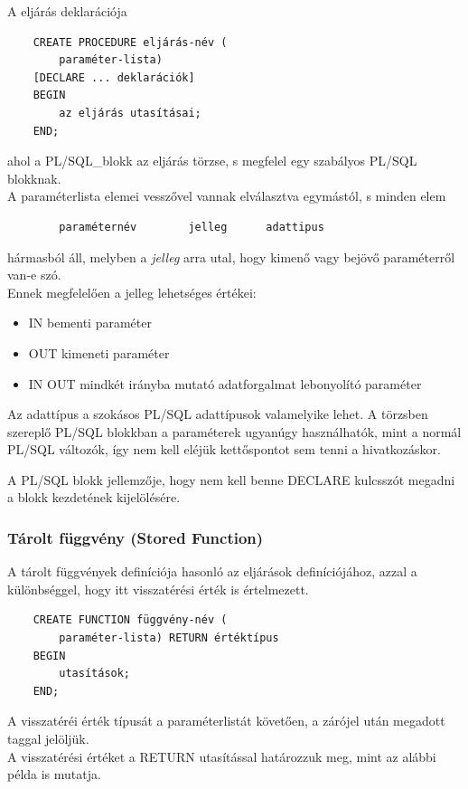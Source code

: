 \documentclass[tikz,12pt,margin=0px]{article}
\begin{document}
    \noindent A eljárás deklarációja
    {\small
    \begin{verbatim}
    CREATE PROCEDURE eljárás-név (
        paraméter-lista)
    [DECLARE ... deklarációk]
    BEGIN
        az eljárás utasításai;
    END;
    \end{verbatim}
    }
    \noindent ahol a PL/SQL\_blokk az eljárás törzse, s megfelel egy szabályos PL/SQL blokknak.\\
    A paraméterlista elemei vesszővel vannak elválasztva egymástól, s minden elem
    \begin{verbatim}
		paraméternév		jelleg		adattipus
    \end{verbatim}
    hármasból áll, melyben a \emph{jelleg} arra utal, hogy kimenő vagy bejövő paraméterről van-e szó.\\
    Ennek megfelelően a jelleg lehetséges értékei:
    \begin{itemize}
	   \item IN		bementi paraméter
	   \item OUT		kimeneti paraméter
	   \item IN OUT	mindkét irányba mutató adatforgalmat lebonyolító paraméter
    \end{itemize}
    \noindent Az adattípus a szokásos PL/SQL adattípusok valamelyike lehet. A törzsben szereplő PL/SQL blokkban a paraméterek ugyanúgy használhatók, mint a normál PL/SQL változók, így nem kell eléjük kettőspontot sem tenni a hivatkozáskor.

    \noindent A PL/SQL blokk jellemzője, hogy nem kell benne DECLARE kulcsszót megadni a blokk kezdetének kijelölésére.
\newpage
    \subsubsection*{Tárolt függvény (Stored Function)}

    \noindent A tárolt függvények definíciója hasonló az eljárások definíciójához, azzal a különbséggel, hogy itt visszatérési érték is értelmezett.
    {\small
    \begin{verbatim}
    CREATE FUNCTION függvény-név (
        paraméter-lista) RETURN értéktípus
    BEGIN
        utasítások;
    END;
    \end{verbatim}
    }
    \noindent A visszatéréi érték típusát a paraméterlistát követően, a zárójel után megadott taggal jelöljük. \\
    A visszatérési értéket a RETURN utasítással határozzuk meg, mint az alábbi példa is mutatja.\\
\end{document}
